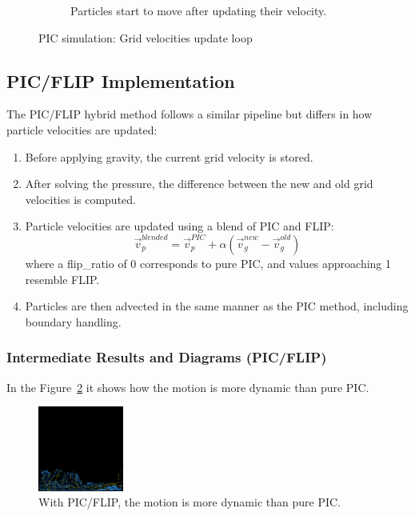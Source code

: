 \begin{figure}[h]
\begin{subfigure}[t]{0.2\textwidth}
    \caption{Particles start to move after updating their velocity.}
  \end{subfigure}
  \caption{PIC simulation: Grid velocities update loop}
  \label{fig:pic}
\end{figure}

\subsection{PIC/FLIP Implementation}

The PIC/FLIP hybrid method follows a similar pipeline but differs in how particle velocities are updated:

\begin{enumerate}
\item Before applying gravity, the current grid velocity is stored.

\item After solving the pressure, the difference between the new and old grid velocities is computed.

\item Particle velocities are updated using a blend of PIC and FLIP:
\begin{equation}
  \vec{v}_p^{blended} = \vec{v}_p^{PIC} + \alpha(\vec{v}_g^{new} - \vec{v}_g^{old})
\end{equation}
where a flip\_ratio of 0 corresponds to pure PIC, and values approaching 1 resemble FLIP.

\item Particles are then advected in the same manner as the PIC method, including boundary handling.
\end{enumerate}

\subsubsection{Intermediate Results and Diagrams (PIC/FLIP)}

In the Figure~\ref{fig:pic_flip} it shows how the motion is more dynamic than pure PIC.

\begin{figure}[h]
  \centering
  \includegraphics[width=0.25\textwidth]{figures/pic_flip_interm.png}
  \caption{With PIC/FLIP, the motion is more dynamic than pure PIC.}
  \label{fig:pic_flip}
\end{figure}


